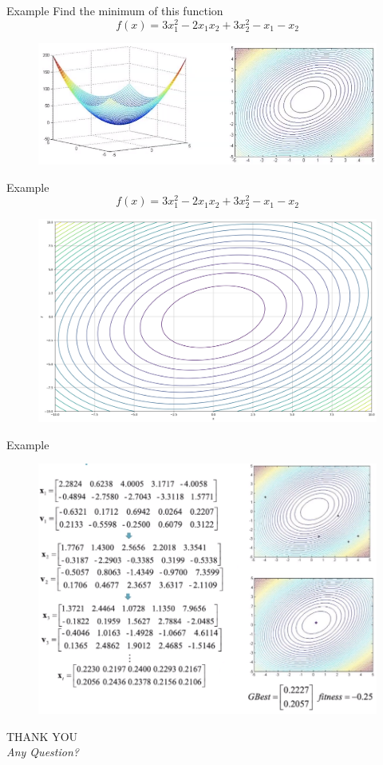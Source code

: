 \documentclass[pdflatex,compress,mathserif]{beamer}
\begin{document}
\begin{frame}{Example}
	Find the minimum of this function
	$$f(x) = 3x_1^2 - 2x_1x_2 + 3x_2^2 - x_1 - x_2$$
	\begin{figure}
		\centering
		\includegraphics[width=\linewidth]{img/15}
	\end{figure}
\end{frame}

\begin{frame}{Example}
	\scriptsize$$f(x) = 3x_1^2 - 2x_1x_2 + 3x_2^2 - x_1 - x_2$$
	\begin{figure}
		\centering
		\includegraphics[width=0.9\linewidth]{img/15a}
	\end{figure}
\end{frame}

\begin{frame}{Example}
	\begin{figure}
		\centering
		\includegraphics[width=\linewidth]{img/16}
	\end{figure}
\end{frame}

\begin{frame}
	\centering
	\LARGE{THANK YOU\\}
	\vspace{0.5cm}
	\large{\emph{Any Question?}}
\end{frame}
\end{document}
